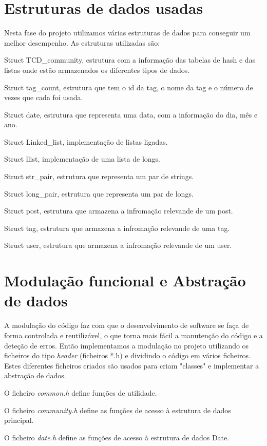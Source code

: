 \documentclass[10pt]{report}
\newcommand\tab[1][0.5cm]{\hspace*{#1}}
\begin{document}
\section{Estruturas de dados usadas}

\tab Nesta fase do projeto utilizamos várias estruturas de dados para conseguir um melhor desempenho. As estruturas utilizadas são:

Struct TCD\_community, estrutura com a informação das tabelas de hash e das listas onde estão armazenados os diferentes tipos de dados.

Struct tag\_count, estrutura que tem o id da tag, o nome da tag e o número de vezes que cada foi usada.

Struct date, estrutura que representa uma data, com a informação do dia, mês e ano.

Struct Linked\_list, implementação de listas ligadas.

Struct llist, implementação de uma lista de longs.

Struct str\_pair, estrutura que representa um par de strings.

Struct long\_pair, estrutura que representa um par de longs.

Struct post, estrutura que armazena a infromação relevande de um post.

Struct tag, estrutura que armazena a infromação relevande de uma tag.

Struct user, estrutura que armazena a infromação relevande de um user.

\section{Modulação funcional e Abstração de dados}

\tab A modulação do código faz com que o desenvolvimento de software se faça de forma controlada e reutilizável, o que torna mais fácil a manutenção do código e a deteção de erros. Então implementamos a modulação no projeto utilizando os ficheiros do tipo \textit{header} (ficheiros *.h) e dividindo o código em vários ficheiros. Estes diferentes ficheiros criados são usados para criam "classes" e implementar a abstração de dados.

O ficheiro \textit{common.h} define funções de utilidade.

O ficheiro \textit{community.h} define as funções de acesso à estrutura de dados principal.

O ficheiro \textit{date.h} define as funções de acesso à estrutura de dados Date.
\end{document}

